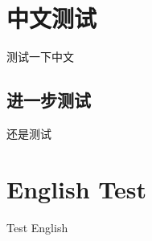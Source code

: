 \documentclass{article}
\begin{document}
    \section{中文测试}
    测试一下中文
        \subsection{进一步测试}
            还是测试
        \section{English Test}
            Test English
\end{document}
